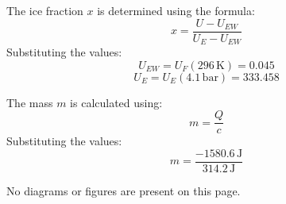 The ice fraction \( x \) is determined using the formula:  
\[
x = \frac{U - U_{EW}}{U_E - U_{EW}}
\]  
Substituting the values:  
\[
U_{EW} = U_{F}(296 \, \text{K}) = 0.045
\]  
\[
U_E = U_{E}(4.1 \, \text{bar}) = 333.458
\]  

The mass \( m \) is calculated using:  
\[
m = \frac{Q}{c}
\]  
Substituting the values:  
\[
m = \frac{-1580.6 \, \text{J}}{314.2 \, \text{J}}
\]  

No diagrams or figures are present on this page.